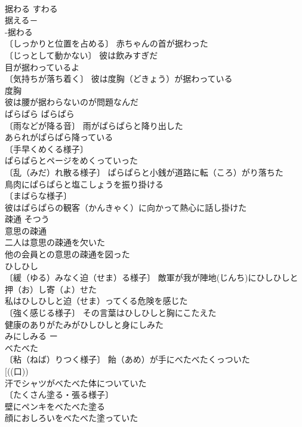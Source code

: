 \documentclass[8pt]{extreport}
\begin{document}
\begin{CJK}{UTF8}{min}
\\	据わる	すわる	
\\	据える－
\\	-据わる 
\\	〔しっかりと位置を占める〕 赤ちゃんの首が据わった 
\\	〔じっとして動かない〕 彼は飲みすぎだ
\\	目が据わっているよ 
\\	〔気持ちが落ち着く〕 彼は度胸（どきょう）が据わっている 
\\	度胸　
\\	彼は腰が据わらないのが問題なんだ 
\\	ぱらぱら	ぱらぱら	
\\	〔雨などが降る音〕 雨がぱらぱらと降り出した 
\\	あられがぱらぱら降っている 
\\	〔手早くめくる様子〕 
\\	ぱらぱらとページをめくっていった 
\\	〔乱（みだ）れ散る様子〕 ぱらぱらと小銭が道路に転（ころ）がり落ちた 
\\	鳥肉にぱらぱらと塩こしょうを振り掛ける 
\\	〔まばらな様子〕 
\\	彼はぱらぱらの観客（かんきゃく）に向かって熱心に話し掛けた 
\\	疎通	そつう	
\\	意思の疎通 
\\	二人は意思の疎通を欠いた 
\\	他の会員との意思の疎通を図った 
\\	ひしひし		
\\	〔緩（ゆる）みなく迫（せま）る様子〕 敵軍が我が陣地(じんち)にひしひしと押（お）し寄（よ）せた 
\\	私はひしひしと迫（せま）ってくる危険を感じた 
\\	〔強く感じる様子〕 その言葉はひしひしと胸にこたえた 
\\	健康のありがたみがひしひしと身にしみた 
\\	みにしみる ー
\\	べたべた		
\\	〔粘（ねば）りつく様子〕 飴（あめ）が手にべたべたくっついた 
\\	[((口))
\\	汗でシャツがべたべた体についていた 
\\	〔たくさん塗る・張る様子〕 
\\	壁にペンキをべたべた塗る 
\\	顔におしろいをべたべた塗っていた 

\end{CJK}
\end{document}
